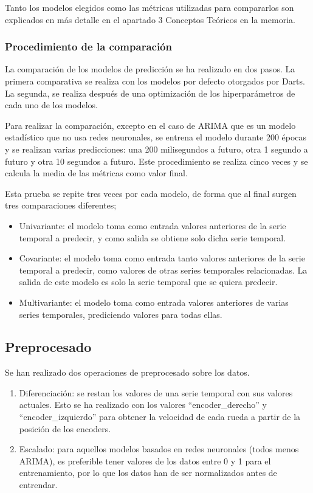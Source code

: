Tanto los modelos elegidos como las métricas utilizadas para compararlos son explicados en más detalle en el apartado 3 Conceptos
Teóricos en la memoria.

\subsubsection{Procedimiento de la comparación}

La comparación de los modelos de predicción se ha realizado en dos pasos. La primera comparativa se 
realiza con los modelos por defecto otorgados por Darts. La segunda, se realiza después de una 
optimización de los hiperparámetros de cada uno de los modelos.

Para realizar la comparación, excepto en el caso de ARIMA que es un modelo estadístico que no usa redes neuronales, 
se entrena el modelo durante 200 épocas y se realizan varias predicciones: una 200 milisegundos a futuro, otra 
1 segundo a futuro y otra 10 segundos a futuro. Este procedimiento se realiza cinco veces y se calcula la media 
de las métricas como valor final.

Esta prueba se repite tres veces por cada modelo, de forma que al final surgen tres comparaciones 
diferentes;
\begin{itemize}
    \item Univariante: el modelo toma como entrada valores anteriores de la serie temporal a predecir,
        y como salida se obtiene solo dicha serie temporal.
    \item Covariante: el modelo toma como entrada tanto valores anteriores de la serie temporal a predecir, 
        como valores de otras series temporales relacionadas. La salida de este modelo es solo la serie temporal 
        que se quiera predecir.
    \item Multivariante: el modelo toma como entrada valores anteriores de varias series temporales, prediciendo valores
        para todas ellas.
\end{itemize}

\subsection{Preprocesado}

Se han realizado dos operaciones de preprocesado sobre los datos.
\begin{enumerate}
    \item Diferenciación: se restan los valores de una serie temporal con sus valores actuales.
        Esto se ha realizado con los valores ``encoder\_derecho'' y ``encoder\_izquierdo'' para obtener
        la velocidad de cada rueda a partir de la posición de los encoders.
    \item Escalado: para aquellos modelos basados en redes neuronales (todos menos ARIMA), es preferible
        tener valores de los datos entre 0 y 1 para el entrenamiento, por lo que los datos han de 
        ser normalizados antes de entrendar.
\end{enumerate}

